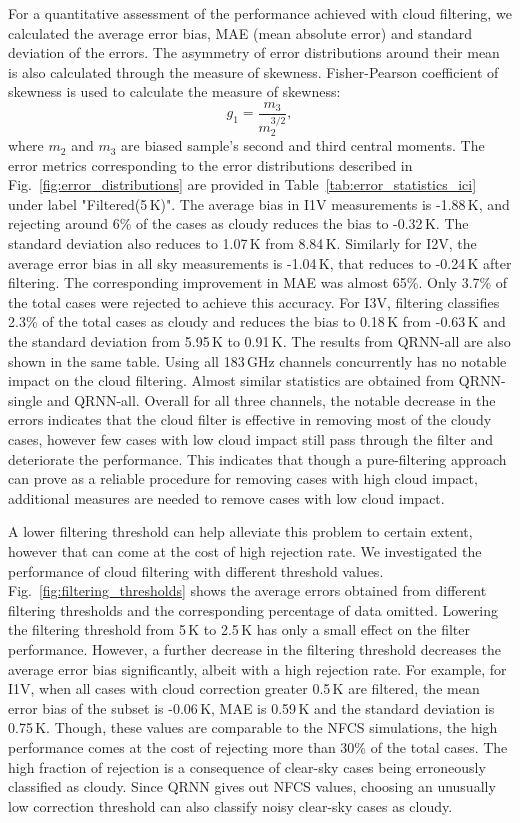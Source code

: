 \documentclass[amt, manuscript]{copernicus}
\begin{document}
For a quantitative assessment of the performance achieved with cloud filtering, we calculated the average error bias, MAE (mean absolute error) and standard deviation of the errors. The asymmetry of error distributions around their mean is also calculated through the measure of skewness. Fisher-Pearson coefficient of skewness is used to calculate the measure of skewness: 
\begin{equation}
g_1 = \frac{m_3}{m_2^{3/2}}, 
\end{equation}
where $m_2$ and $m_3$ are biased sample's second and third central moments. The error metrics corresponding to the error distributions described in Fig.~\ref{fig:error_distributions} are provided in Table~\ref{tab:error_statistics_ici} under label "Filtered(5\,K)". The average bias in I1V measurements is -1.88\,K, and rejecting around 6\% of the cases as cloudy reduces the bias to -0.32\,K. The standard deviation also reduces to 1.07\,K from 8.84\,K. Similarly for I2V, the average error bias in all sky measurements is -1.04\,K, that reduces to -0.24\,K after filtering. The corresponding improvement in MAE was almost 65\%. Only 3.7\% of the total cases were rejected to achieve this accuracy. For I3V, filtering classifies 2.3\% of the total cases as cloudy and reduces the bias to 0.18\,K from -0.63\,K and the standard deviation from 5.95\,K to 0.91\,K. The results from QRNN-all are also shown in the same table. Using all 183\,GHz channels concurrently has no notable impact on the cloud filtering. Almost similar statistics are obtained from QRNN-single and QRNN-all. Overall for all three channels, the notable decrease in the errors indicates that the cloud filter is effective in removing most of the cloudy cases, however few cases with low cloud impact still pass through the filter and deteriorate the performance. This indicates that though a pure-filtering approach can prove as a reliable procedure for removing cases with high cloud impact, additional measures are needed to remove cases with low cloud impact.

A lower filtering threshold can help alleviate this problem to certain extent, however that can come at the cost of high rejection rate. We investigated the performance of cloud filtering with different threshold values. Fig.~\ref{fig:filtering_thresholds} shows the average errors obtained from different filtering thresholds and the corresponding percentage of data omitted. Lowering the filtering threshold from 5\,K to 2.5\,K has only a small effect on the filter performance. However, a further decrease in the filtering threshold decreases the average error bias significantly, albeit with a high rejection rate. For example, for I1V, when all cases with cloud correction greater 0.5\,K are filtered, the mean error bias of the subset is -0.06\,K, MAE is 0.59\,K and the standard deviation is 0.75\,K. Though, these values are comparable to the NFCS simulations, the high performance comes at the cost of rejecting more than 30\% of the total cases. The high fraction of rejection is a consequence of clear-sky cases being erroneously classified as cloudy. Since QRNN gives out NFCS values, choosing an unusually low correction threshold can also classify noisy clear-sky cases as cloudy. 
\end{document}
